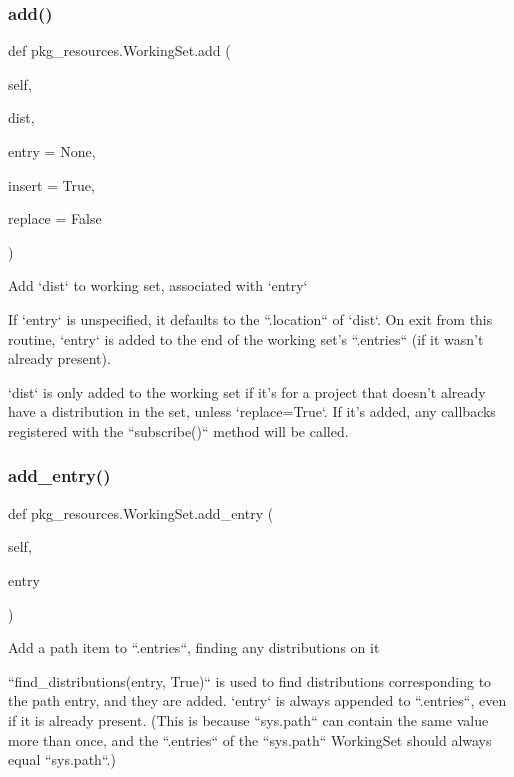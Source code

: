 \subsubsection{\texorpdfstring{add()}{add()}}
{\footnotesize\ttfamily def pkg\+\_\+resources.\+Working\+Set.\+add (\begin{DoxyParamCaption}\item[{}]{self,  }\item[{}]{dist,  }\item[{}]{entry = {\ttfamily None},  }\item[{}]{insert = {\ttfamily True},  }\item[{}]{replace = {\ttfamily False} }\end{DoxyParamCaption})}

\begin{DoxyVerb}Add `dist` to working set, associated with `entry`

If `entry` is unspecified, it defaults to the ``.location`` of `dist`.
On exit from this routine, `entry` is added to the end of the working
set's ``.entries`` (if it wasn't already present).

`dist` is only added to the working set if it's for a project that
doesn't already have a distribution in the set, unless `replace=True`.
If it's added, any callbacks registered with the ``subscribe()`` method
will be called.
\end{DoxyVerb}
 \mbox{\label{classpkg__resources_1_1WorkingSet_aed20abcb6a85cdc25dff1686ad480958}} 
\subsubsection{\texorpdfstring{add\+\_\+entry()}{add\_entry()}}
{\footnotesize\ttfamily def pkg\+\_\+resources.\+Working\+Set.\+add\+\_\+entry (\begin{DoxyParamCaption}\item[{}]{self,  }\item[{}]{entry }\end{DoxyParamCaption})}

\begin{DoxyVerb}Add a path item to ``.entries``, finding any distributions on it

``find_distributions(entry, True)`` is used to find distributions
corresponding to the path entry, and they are added.  `entry` is
always appended to ``.entries``, even if it is already present.
(This is because ``sys.path`` can contain the same value more than
once, and the ``.entries`` of the ``sys.path`` WorkingSet should always
equal ``sys.path``.)
\end{DoxyVerb}
 \mbox{\label{classpkg__resources_1_1WorkingSet_a4eb8b69f25d05e0edb4f2a8d162d096b}} 
